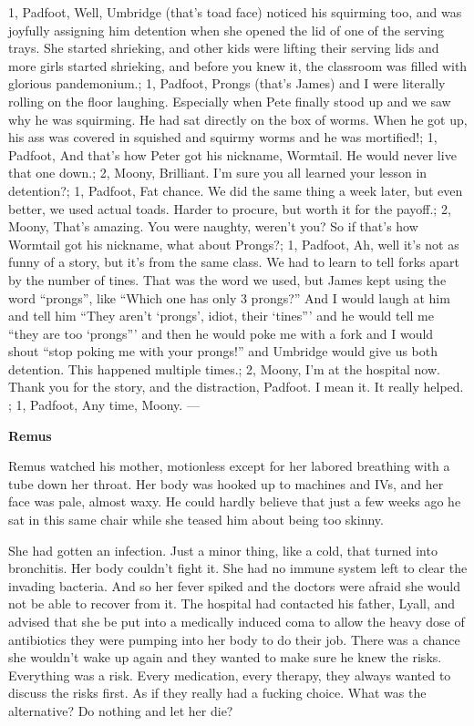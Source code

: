 \documentclass[12pt,twoside,openright]{memoir}
\newcommand\smsFrom{1}
\newcommand\smsTo{2}
\newcommand\Padfoot{Padfoot}
\newcommand\Moony{Moony}
\begin{document}
{\smsFrom, {\Padfoot}, {Well, Umbridge (that's toad face) noticed his squirming too, and was joyfully assigning him detention when she opened the lid of one of the serving trays. She started shrieking, and other kids were lifting their serving lids and more girls started shrieking, and before you knew it, the classroom was filled with glorious pandemonium.};
\smsFrom, {\Padfoot}, {Prongs (that's James) and I were literally rolling on the floor laughing. Especially when Pete finally stood up and we saw why he was squirming. He had sat directly on the box of worms. When he got up, his ass was covered in squished and squirmy worms and he was mortified!};
\smsFrom, {\Padfoot}, {And that's how Peter got his nickname, Wormtail. He would never live that one down.};
\smsTo, {\Moony}, { Brilliant. I'm sure you all learned your lesson in detention?};
\smsFrom, {\Padfoot}, {Fat chance. We did the same thing a week later, but even better, we used actual toads. Harder to procure, but worth it for the payoff.};
\smsTo, {\Moony}, { That's amazing. You were naughty, weren't you? So if that's how Wormtail got his nickname, what about Prongs?};
\smsFrom, {\Padfoot}, {Ah, well it's not as funny of a story, but it's from the same class. We had to learn to tell forks apart by the number of tines. That was the word we used, but James kept using the word ``prongs'', like ``Which one has only 3 prongs?'' And I would laugh at him and tell him ``They aren't ‘prongs', idiot, their ‘tines''' and he would tell me
``they are too ‘prongs''' and then he would poke me with a fork and I would shout ``stop poking me with your prongs!'' and Umbridge would give us both detention. This happened multiple times.};
\smsTo, {\Moony}, {I'm at the hospital now. Thank you for the story, and the distraction, Padfoot. I mean it. It really helped. };
\smsFrom, {\Padfoot}, {Any time, Moony.}
}
---

\textbf{Remus} 

Remus watched his mother, motionless except for her labored breathing with a tube down her throat. Her body was hooked up to machines and IVs, and her face was pale, almost waxy. He could hardly believe that just a few weeks ago he sat in this same chair while she teased him about being too skinny. 

She had gotten an infection. Just a minor thing, like a cold, that turned into bronchitis. Her body couldn't fight it. She had no immune system left to clear the invading bacteria. And so her fever spiked and the doctors were afraid she would not be able to recover from it. The hospital had contacted his father, Lyall, and advised that she be put into a medically induced coma to allow the heavy dose of antibiotics they were pumping into her body to do their job. There was a chance she wouldn't wake up again and they wanted to make sure he knew the risks. Everything was a risk. Every medication, every therapy, they always wanted to discuss the risks first. As if they really had a fucking choice. What was the alternative? Do nothing and let her die?
\end{document}
